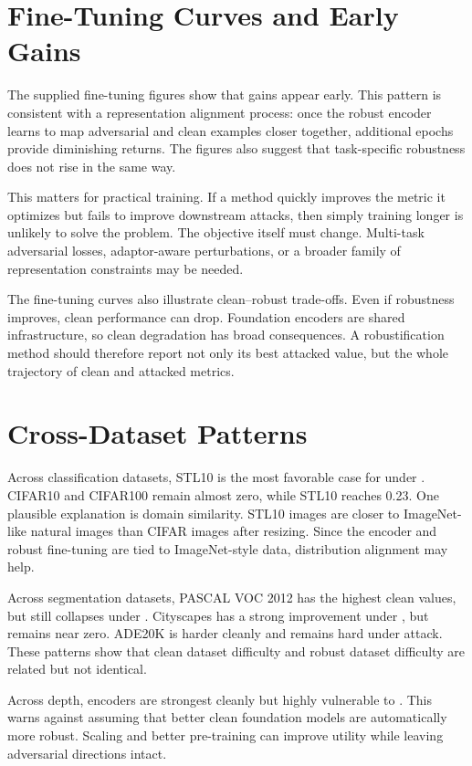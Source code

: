 \section{Fine-Tuning Curves and Early Gains}

The supplied fine-tuning figures show that \DeACL gains appear early. This pattern is consistent with a representation alignment process: once the robust encoder learns to map adversarial and clean examples closer together, additional epochs provide diminishing returns. The figures also suggest that task-specific robustness does not rise in the same way.

This matters for practical training. If a method quickly improves the metric it optimizes but fails to improve downstream attacks, then simply training longer is unlikely to solve the problem. The objective itself must change. Multi-task adversarial losses, adaptor-aware perturbations, or a broader family of representation constraints may be needed.

The fine-tuning curves also illustrate clean--robust trade-offs. Even if \EmbedAttack robustness improves, clean performance can drop. Foundation encoders are shared infrastructure, so clean degradation has broad consequences. A robustification method should therefore report not only its best attacked value, but the whole trajectory of clean and attacked metrics.

\section{Cross-Dataset Patterns}

Across classification datasets, STL10 is the most favorable case for \DeACL under \PGD. CIFAR10 and CIFAR100 remain almost zero, while STL10 reaches 0.23. One plausible explanation is domain similarity. STL10 images are closer to ImageNet-like natural images than CIFAR images after resizing. Since the encoder and robust fine-tuning are tied to ImageNet-style data, distribution alignment may help.

Across segmentation datasets, PASCAL VOC 2012 has the highest clean values, but still collapses under \SegPGD. Cityscapes has a strong \EmbedAttack improvement under \DeACL, but \SegPGD remains near zero. ADE20K is harder cleanly and remains hard under attack. These patterns show that clean dataset difficulty and robust dataset difficulty are related but not identical.

Across depth, \DINOv encoders are strongest cleanly but highly vulnerable to \DepthPGD. This warns against assuming that better clean foundation models are automatically more robust. Scaling and better pre-training can improve utility while leaving adversarial directions intact.

